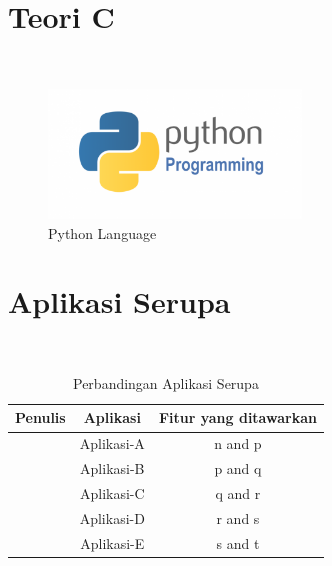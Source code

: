 \section{Teori C}

\blindtext \cite{Mittal2016,uu11} \\

\begin{figure}
	\centering
	\includegraphics[width=0.6\textwidth]
	{pics/python.png}
	\caption{Python Language}
	\label{fig:3}
\end{figure}

\section{Aplikasi Serupa}

\blindtext \\

\begin{table}[h]
	\centering
	\caption{Perbandingan Aplikasi Serupa}
	\label{tab:1}
	\begin{tabular}{ c c c }
		\hline
		\textbf{Penulis} 		& \textbf{Aplikasi}  & \textbf{Fitur yang ditawarkan}\\ \hline \hline
		\cite{Narayana2010} 	& Aplikasi-A		& n and p \\ 
		\cite{Patel2016} 		& Aplikasi-B		& p and q \\ 
		\cite{Phadte2017} 		& Aplikasi-C		& q and r \\ 
		\cite{Rachmawanto2017} 	& Aplikasi-D		& r and s \\ 
		\cite{Reddy2016} 		& Aplikasi-E		& s and t \\ \hline
	\end{tabular}
\end{table}